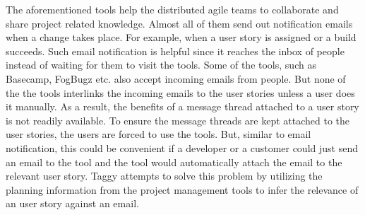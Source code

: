 The aforementioned tools help the distributed agile teams to collaborate and share project related knowledge. Almost all of them send out notification emails when a change takes place. For example, when a user story is assigned or a build succeeds. Such email notification is helpful since it reaches the inbox of people instead of waiting for them to visit the tools. Some of the tools, such as Basecamp, FogBugz etc. also accept incoming emails from people. But none of the the tools interlinks the incoming emails to the user stories unless a user does it manually. As a result, the benefits of a message thread attached to a user story is not readily available. To ensure the message threads are kept attached to the user stories, the users are forced to use the tools. But, similar to email notification, this could be convenient if a developer or a customer could just send an email to the tool and the tool would automatically attach the email to the relevant user story. Taggy attempts to solve this problem by utilizing the planning information from the project management tools to infer the relevance of an user story against an email.